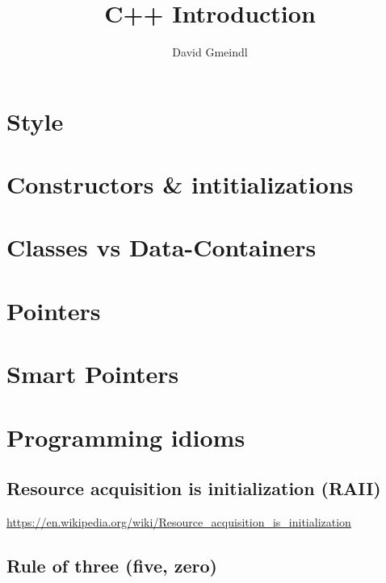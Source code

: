 \documentclass[
10pt,
a4paper,
parskip=half,	%
DIV=0,			%
BCOR=10mm
]{scrartcl}
\author{David Gmeindl}
\title{C++ Introduction}
\begin{document}
	
	
	\pagestyle{empty}
	\maketitle
	\tableofcontents
	\thispagestyle{empty}
	
	\newpage
	\pagebreak
	
	\pagestyle{scrheadings}
	
\section{Style}

	
\section{Constructors \& intitializations}
	

	
\section{Classes vs Data-Containers}
	
\pagebreak
\section{Pointers}

	
\section{Smart Pointers}
	
\section{Programming idioms} 
\label{sec:programming-idioms}
	\subsection{Resource acquisition is initialization (RAII)}
	
	\url{https://en.wikipedia.org/wiki/Resource_acquisition_is_initialization}
	
	\subsection{Rule of three (five, zero)}
	\label{subsec:rule-of-three}
	
\end{document}
